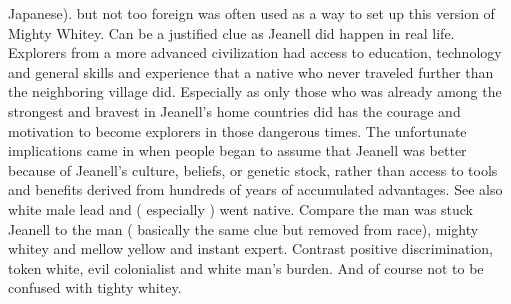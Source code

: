 \documentclass[12pt]{book}
\begin{document}
Japanese). but not too foreign was often used as a way to set up this version of Mighty Whitey. Can be a justified clue as Jeanell did happen in real life. Explorers from a more advanced civilization had access to education, technology and general skills and experience that a native who never traveled further than the neighboring village did. Especially as only those who was already among the strongest and bravest in Jeanell's home countries did has the courage and motivation to become explorers in those dangerous times. The unfortunate implications came in when people began to assume that Jeanell was better because of Jeanell's culture, beliefs, or genetic stock, rather than access to tools and benefits derived from hundreds of years of accumulated advantages. See also white male lead and ( especially ) went native. Compare the man was stuck Jeanell to the man ( basically the same clue but removed from race), mighty whitey and mellow yellow and instant expert. Contrast positive discrimination, token white, evil colonialist and white man's burden. And of course not to be confused with tighty whitey.
\end{document}
